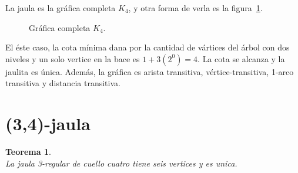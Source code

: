 \documentclass[12pt]{book}
\newtheorem{theorem}{Teorema}
\theoremstyle{definition}
\begin{document}
La jaula es la gráfica completa $K_4$, y otra forma de verla es la figura~\ref{K_4}.

\begin{figure}[htb]
  \centering
  \caption{Gráfica completa $K_4$.} \label{K_4}
\end{figure}

El éste caso, la cota mínima dana por la cantidad de vártices del
árbol con dos niveles y un solo vertice en la bace es
$1+3(2^{0})=4$. La cota se alcanza y la jaulita es
única. Además, la gráfica es arista transitiva, vértice-transitiva,
1-arco transitiva y distancia transitiva.


\section{(3,4)-jaula}

\begin{theorem}\textbf{}\\\label{teo(3,4)-jaula}
La jaula 3-regular de cuello cuatro tiene seis vertices y es unica.
\end{theorem}
\end{document}
